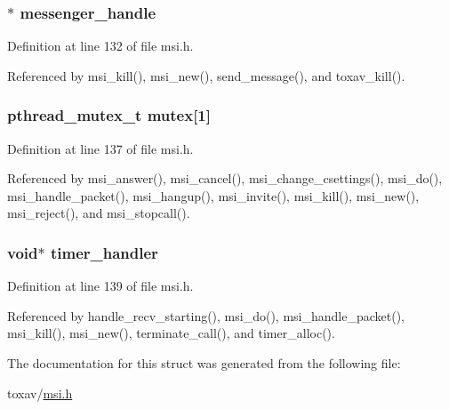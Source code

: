 \hypertarget{struct___m_s_i_session_a2adfe301d17504006b8321f71f642039}{
\subsubsection[{messenger\+\_\+handle}]{$\ast$ messenger\+\_\+handle}}\label{struct___m_s_i_session_a2adfe301d17504006b8321f71f642039}


Definition at line 132 of file msi.\+h.



Referenced by msi\+\_\+kill(), msi\+\_\+new(), send\+\_\+message(), and toxav\+\_\+kill().

\hypertarget{struct___m_s_i_session_ab4293016252c4d4e63549b0773fa0f33}{
\subsubsection[{mutex}]{\setlength{\rightskip}{0pt plus 5cm}pthread\+\_\+mutex\+\_\+t mutex\mbox{[}1\mbox{]}}}\label{struct___m_s_i_session_ab4293016252c4d4e63549b0773fa0f33}


Definition at line 137 of file msi.\+h.



Referenced by msi\+\_\+answer(), msi\+\_\+cancel(), msi\+\_\+change\+\_\+csettings(), msi\+\_\+do(), msi\+\_\+handle\+\_\+packet(), msi\+\_\+hangup(), msi\+\_\+invite(), msi\+\_\+kill(), msi\+\_\+new(), msi\+\_\+reject(), and msi\+\_\+stopcall().

\hypertarget{struct___m_s_i_session_a06ab765308a606d809c4c2a2c71710ce}{
\subsubsection[{timer\+\_\+handler}]{\setlength{\rightskip}{0pt plus 5cm}void$\ast$ timer\+\_\+handler}}\label{struct___m_s_i_session_a06ab765308a606d809c4c2a2c71710ce}


Definition at line 139 of file msi.\+h.



Referenced by handle\+\_\+recv\+\_\+starting(), msi\+\_\+do(), msi\+\_\+handle\+\_\+packet(), msi\+\_\+kill(), msi\+\_\+new(), terminate\+\_\+call(), and timer\+\_\+alloc().



The documentation for this struct was generated from the following file\+:\begin{DoxyCompactItemize}
\item 
toxav/\hyperlink{msi_8h}{msi.\+h}\end{DoxyCompactItemize}
